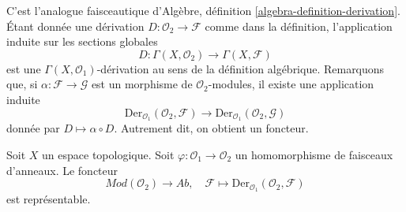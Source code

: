 \noindent
C'est l'analogue faisceautique d'Algèbre, définition
\ref{algebra-definition-derivation}. Étant donnée une dérivation
$D : \mathcal{O}_2 \to \mathcal{F}$ comme dans la définition,
l'application induite sur les sections globales
$$
D : \Gamma(X, \mathcal{O}_2) \longrightarrow \Gamma(X, \mathcal{F})
$$
est une $\Gamma(X, \mathcal{O}_1)$-dérivation au sens de la définition
algébrique. Remarquons que, si
$\alpha : \mathcal{F} \to \mathcal{G}$ est un morphisme de
$\mathcal{O}_2$-modules, il existe une application induite
$$
\text{Der}_{\mathcal{O}_1}(\mathcal{O}_2, \mathcal{F})
\longrightarrow
\text{Der}_{\mathcal{O}_1}(\mathcal{O}_2, \mathcal{G})
$$
donnée par $D \mapsto \alpha \circ D$. Autrement dit, on obtient un
foncteur.

\begin{lemma}
\label{lemma-universal-module}
Soit $X$ un espace topologique. Soit
$\varphi : \mathcal{O}_1 \to \mathcal{O}_2$ un homomorphisme de faisceaux
d'anneaux. Le foncteur
$$
\textit{Mod}(\mathcal{O}_2) \longrightarrow \textit{Ab}, \quad
\mathcal{F} \longmapsto \text{Der}_{\mathcal{O}_1}(\mathcal{O}_2, \mathcal{F})
$$
est représentable.
\end{lemma}


